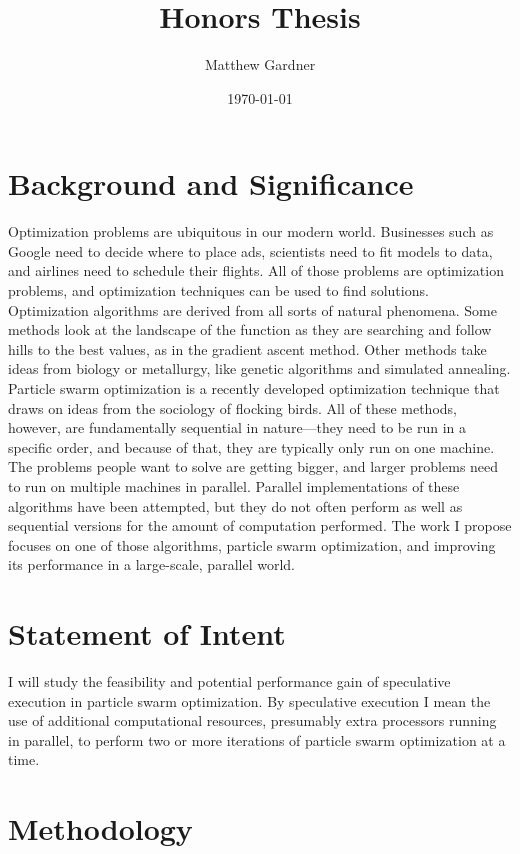 \documentclass[onecolumn, 12pt]{article}
\title{Honors Thesis}
\author{Matthew Gardner}
\date{\today}
\begin{document}
\maketitle

\section{Background and Significance}

Optimization problems are ubiquitous in our modern world.  Businesses such as
Google need to decide where to place ads, scientists need to fit models to
data, and airlines need to schedule their flights.  All of those problems are
optimization problems, and optimization techniques can be used to find
solutions.  Optimization algorithms are derived from all sorts of natural
phenomena.  Some methods look at the landscape of the function as they are
searching and follow hills to the best values, as in the gradient ascent
method.  Other methods take ideas from biology or metallurgy, like genetic
algorithms and simulated annealing.  Particle swarm optimization is a recently
developed optimization technique that draws on ideas from the sociology of
flocking birds.  All of these methods, however, are fundamentally sequential in
nature---they need to be run in a specific order, and because of that, they are
typically only run on one machine.  The problems people want to solve are
getting bigger, and larger problems need to run on multiple machines in
parallel.  Parallel implementations of these algorithms have been attempted,
but they do not often perform as well as sequential versions for the amount of
computation performed.  The work I propose focuses on one of those algorithms,
particle swarm optimization, and improving its performance in a large-scale,
parallel world.


\section{Statement of Intent}

I will study the feasibility and potential performance gain of speculative
execution in particle swarm optimization.  By speculative execution I mean the
use of additional computational resources, presumably extra processors running
in parallel, to perform two or more iterations of particle swarm optimization
at a time.

\section{Methodology}
\end{document}
